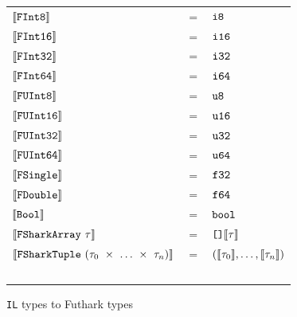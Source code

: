 \begin{figure}
  \centering
\begin{tabular}{@{}l c l}%
  $\evals{\lit{FInt8}}$ & $=$ & $\lit{i8} $ \\ 
  $\evals{\lit{FInt16}}$ & $=$ & $\lit{i16}$
  \\              
  $\evals{\lit{FInt32}}$ & $=$ & $\lit{i32} $ \\ 
  $\evals{\lit{FInt64}}$ & $=$ & $\lit{i64} $
  \\
  $\evals{\lit{FUInt8}}$ & $=$ & $\lit{u8} $ \\ 
  $\evals{\lit{FUInt16}}$ & $=$ & $\lit{u16} $ 
  \\               
  $\evals{\lit{FUInt32}}$ & $=$ & $\lit{u32} $ \\ 
  $\evals{\lit{FUInt64}}$ & $=$ & $\lit{u64} $ 
  \\
  $\evals{\lit{FSingle}}$ & $=$ & $\lit{f32} $ \\ 
  $\evals{\lit{FDouble}}$ & $=$ & $\lit{f64} $ \\
  $\evals{\lit{Bool}}$ & $=$ & $\lit{bool} $ \\ 
  $\evals{\lit{FSharkArray}~\tau}$ & $=$ & $\lit{[]}\evals{\tau}$
  \\
  $\evals{\lit{\fshark{}Tuple}~({\tau_0}~\times~\ldots~\times~{\tau_n})}$ & $=$ & $(\evals{\tau_0},\ldots,\evals{\tau_n})$ \\ ~ \\
\end{tabular}
\caption{\texttt{\fshark{}IL} types to Futhark types}
\end{figure}

